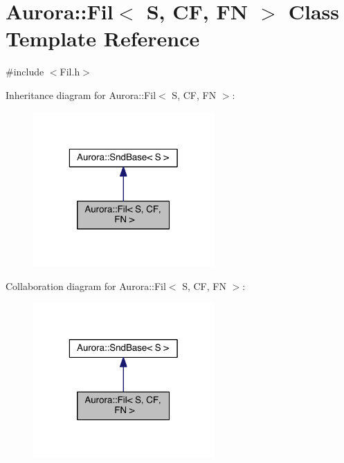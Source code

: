 \hypertarget{class_aurora_1_1_fil}{}\section{Aurora\+:\+:Fil$<$ S, CF, FN $>$ Class Template Reference}
\label{class_aurora_1_1_fil}


{\ttfamily \#include $<$Fil.\+h$>$}



Inheritance diagram for Aurora\+:\+:Fil$<$ S, CF, FN $>$\+:
\nopagebreak
\begin{figure}[H]
\begin{center}
\leavevmode
\includegraphics[width=196pt]{class_aurora_1_1_fil__inherit__graph}
\end{center}
\end{figure}


Collaboration diagram for Aurora\+:\+:Fil$<$ S, CF, FN $>$\+:
\nopagebreak
\begin{figure}[H]
\begin{center}
\leavevmode
\includegraphics[width=196pt]{class_aurora_1_1_fil__coll__graph}
\end{center}
\end{figure}
